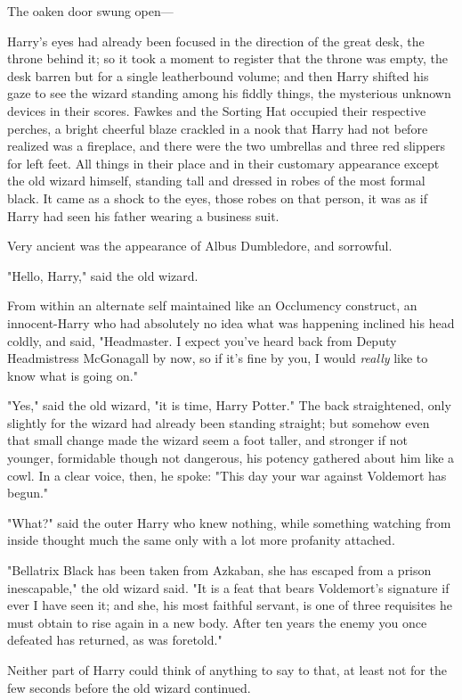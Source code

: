 The oaken door swung open---

Harry's eyes had already been focused in the direction of the great desk, the
throne behind it; so it took a moment to register that the throne was empty,
the desk barren but for a single leatherbound volume; and then Harry shifted
his gaze to see the wizard standing among his fiddly things, the mysterious
unknown devices in their scores. Fawkes and the Sorting Hat occupied their
respective perches, a bright cheerful blaze crackled in a nook that Harry had
not before realized was a fireplace, and there were the two umbrellas and three
red slippers for left feet. All things in their place and in their customary
appearance except the old wizard himself, standing tall and dressed in robes of
the most formal black. It came as a shock to the eyes, those robes on that
person, it was as if Harry had seen his father wearing a business suit.

Very ancient was the appearance of Albus Dumbledore, and sorrowful.

"Hello, Harry," said the old wizard.

From within an alternate self maintained like an Occlumency construct, an
innocent-Harry who had absolutely no idea what was happening inclined his head
coldly, and said, "Headmaster. I expect you've heard back from Deputy
Headmistress McGonagall by now, so if it's fine by you, I would \emph{really}
like to know what is going on."

"Yes," said the old wizard, "it is time, Harry Potter." The back straightened,
only slightly for the wizard had already been standing straight; but somehow
even that small change made the wizard seem a foot taller, and stronger if not
younger, formidable though not dangerous, his potency gathered about him like a
cowl. In a clear voice, then, he spoke: "This day your war against Voldemort
has begun."

"What?" said the outer Harry who knew nothing, while something watching from
inside thought much the same only with a lot more profanity attached.

"Bellatrix Black has been taken from Azkaban, she has escaped from a prison
inescapable," the old wizard said. "It is a feat that bears Voldemort's
signature if ever I have seen it; and she, his most faithful servant, is one of
three requisites he must obtain to rise again in a new body. After ten years
the enemy you once defeated has returned, as was foretold."

Neither part of Harry could think of anything to say to that, at least not for
the few seconds before the old wizard continued.

